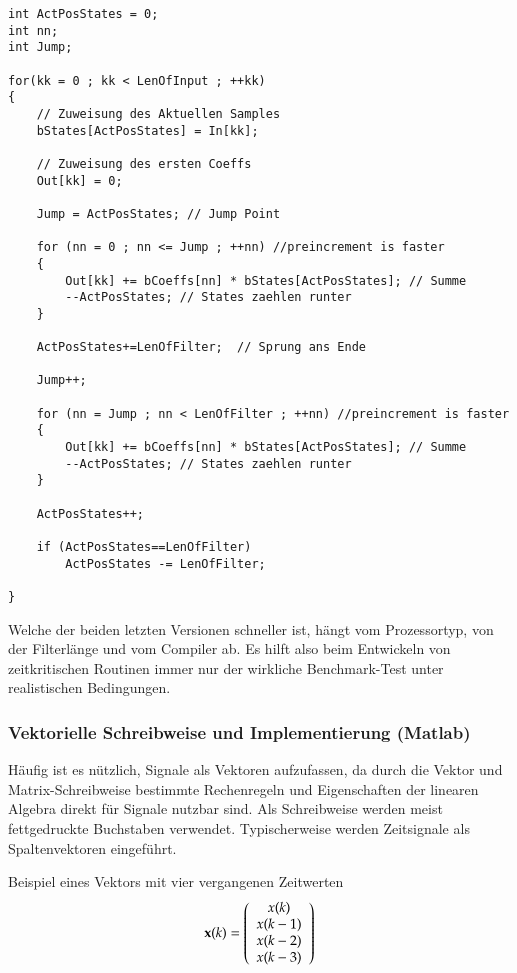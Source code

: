 \begin{verbatim}
int ActPosStates = 0;
int nn;
int Jump;

for(kk = 0 ; kk < LenOfInput ; ++kk)
{
    // Zuweisung des Aktuellen Samples
    bStates[ActPosStates] = In[kk];

    // Zuweisung des ersten Coeffs
    Out[kk] = 0;

    Jump = ActPosStates; // Jump Point

    for (nn = 0 ; nn <= Jump ; ++nn) //preincrement is faster
    {
        Out[kk] += bCoeffs[nn] * bStates[ActPosStates]; // Summe
        --ActPosStates; // States zaehlen runter
    }

    ActPosStates+=LenOfFilter;  // Sprung ans Ende

    Jump++;

    for (nn = Jump ; nn < LenOfFilter ; ++nn) //preincrement is faster
    {
        Out[kk] += bCoeffs[nn] * bStates[ActPosStates]; // Summe
        --ActPosStates; // States zaehlen runter
    }

    ActPosStates++;

    if (ActPosStates==LenOfFilter)
        ActPosStates -= LenOfFilter;

}

\end{verbatim}

Welche der beiden letzten Versionen schneller ist, hängt vom
Prozessortyp, von der Filterlänge und vom Compiler ab. Es hilft
also beim Entwickeln von zeitkritischen Routinen immer nur der
wirkliche Benchmark-Test unter realistischen Bedingungen.

\subsubsection{Vektorielle Schreibweise und Implementierung (Matlab)}
Häufig ist es nützlich, Signale als Vektoren aufzufassen, da durch die Vektor und
Matrix-Schreibweise bestimmte Rechenregeln und Eigenschaften der linearen Algebra
direkt für Signale nutzbar sind. Als Schreibweise werden meist fettgedruckte
Buchstaben verwendet. Typischerweise werden Zeitsignale als Spaltenvektoren eingeführt.

Beispiel eines Vektors mit vier vergangenen Zeitwerten
\begin{equation}\label{eq:DefSpaltenvektor}
    \vek{x}(k) = \left(%
\begin{array}{c}
  x(k) \\
  x(k-1) \\
  x(k-2) \\
  x(k-3) \\
\end{array}%
\right)
\end{equation}

